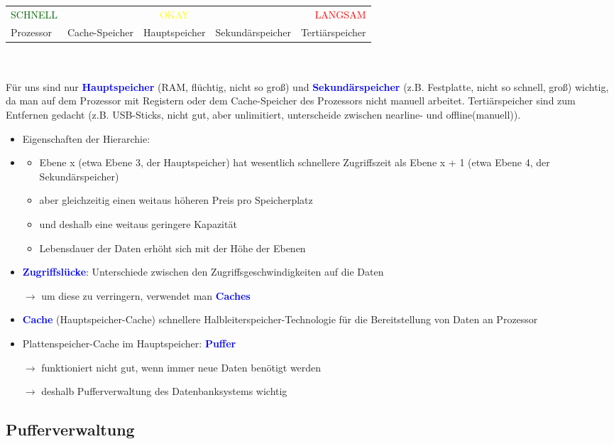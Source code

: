 \documentclass{scrartcl}
\newcommand{\key}[1]{{\textcolor{blue}{\textbf{#1}}}}
\begin{document}
\begin{tabular}{llclr}
	\textcolor{darkgreen}{SCHNELL} && \textcolor{yellow}{OKAY} && \textcolor{red}{LANGSAM} \\
	Prozessor & Cache-Speicher & Hauptspeicher & Sekundärspeicher & Tertiärspeicher \\
\end{tabular}\\
\\
Für uns sind nur \key{Hauptspeicher} (RAM, flüchtig, nicht so groß) und \key{Sekundärspeicher} (z.B. Festplatte, nicht so schnell, groß) wichtig, da man auf dem Prozessor mit Registern oder dem Cache-Speicher des Prozessors nicht manuell arbeitet. Tertiärspeicher sind zum Entfernen gedacht (z.B. USB-Sticks, nicht gut, aber unlimitiert, unterscheide zwischen nearline- und offline(manuell)).
\\
\begin{itemize}
	\itemsep0em
	\item Eigenschaften der Hierarchie:
		\item \begin{itemize}
		\itemsep0em
		\item Ebene x (etwa Ebene 3, der Hauptspeicher) hat wesentlich schnellere Zugriffszeit als Ebene x + 1 (etwa Ebene 4, der Sekundärspeicher)
		\item aber gleichzeitig einen weitaus höheren Preis pro Speicherplatz
		\item und deshalb eine weitaus geringere Kapazität
		\item Lebensdauer der Daten erhöht sich mit der Höhe der Ebenen
	\end{itemize}
	\item \key{Zugriffslücke}: Unterschiede zwischen den Zugriffsgeschwindigkeiten auf die Daten
	\item[$\rightarrow$] um diese zu verringern, verwendet man \key{Caches}
	\item \key{Cache} (Hauptspeicher-Cache) schnellere Halbleiterspeicher-Technologie für die Bereitstellung von Daten an Prozessor
	\item Plattenspeicher-Cache im Hauptspeicher: \key{Puffer}
	\item[$\rightarrow$] funktioniert nicht gut, wenn immer neue Daten benötigt werden
	\item[$\rightarrow$] deshalb Pufferverwaltung des Datenbanksystems wichtig
\end{itemize}

\subsection{Pufferverwaltung}
\end{document}
